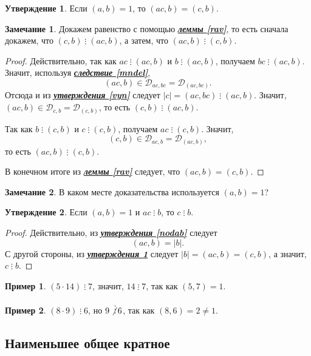 \documentclass[14pt, a4paper]{extarticle}
\theoremstyle{definition}
\newtheorem*{remark}{Замечание}
\newtheorem{example}{Пример}
\newtheorem{statement}{Утверждение}
\newcommand{\divisible}{\mathop{\vdots}}
\begin{document}
	\begin{statement}
	\label{vzpr}
		Если $(a,b)=1$, то $(ac,b)=(c,b)$.
	\end{statement}
	\begin{remark}
		Докажем равенство с помощью \hyperref[rav]{\textbf{\textit{леммы \ref*{rav}}}}, то есть сначала докажем, что $(c,b)\divisible(ac,b)$, а затем, что $(ac,b)\divisible(c,b)$.
	\end{remark}
	\begin{proof}
		Действительно, так как $ac\divisible(ac,b)$ и $b\divisible(ac,b)$, получаем $bc\divisible(ac,b)$. Значит, используя \hyperref[mndel]{\textbf{\textit{следствие \ref*{mndel}}}}, $$(ac,b)\in\mathcal{D}_{ac,bc}=\mathcal{D}_{(ac,bc)}.$$ Отсюда и из \hyperref[vyn]{\textbf{\textit{утверждения \ref*{vyn}}}} следует $|c|=(ac,bc)\divisible(ac,b)$. Значит, $(ac,b)\in\mathcal{D}_{c,b}=\mathcal{D}_{(c,b)}$, то есть $(c,b)\divisible(ac,b)$.
		
		Так как $b\divisible(c,b)$ и $c\divisible(c,b)$, получаем $ac\divisible(c,b)$. Значит, $$(c,b)\in\mathcal{D}_{ac,b}=\mathcal{D}_{(ac,b)},$$ то есть $(ac,b)\divisible(c,b)$.
		
		В конечном итоге из \hyperref[rav]{\textbf{\textit{леммы \ref*{rav}}}} следует, что $(ac,b)=(c,b)$.
	\end{proof}
	\begin{remark}
		В каком месте доказательства используется $(a,b)=1$?
	\end{remark}

	\begin{statement}
	\label{divpr}
		Если $(a,b)=1$ и $ac\divisible b$, то $c\divisible b$.
	\end{statement}
	\begin{proof}
		Действительно, из \hyperref[nodab]{\textbf{\textit{утверждения \ref*{nodab}}}} следует $$(ac,b)=|b|.$$ С другой стороны, из \hyperref[vzpr]{\textbf{\textit{утверждения \ref*{vzpr}}}} следует $|b|=(ac,b)=(c,b)$, а значит, $c\divisible b$.
	\end{proof}

	\begin{example}
		$(5\cdot14)\divisible7$, значит, $14\divisible7$, так как $(5,7)=1$.
	\end{example}
	\begin{example}
		$(8\cdot9)\divisible 6$, но $9\not\divisible6$, так как $(8,6)=2\neq1$.
	\end{example}

\subsection{Наименьшее общее кратное}
\label{nok}
	
\end{document}
